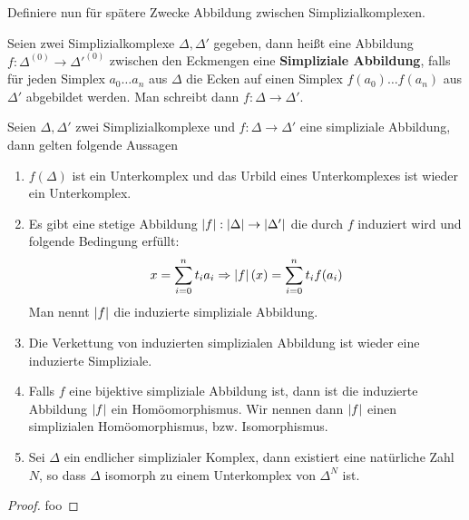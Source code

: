 Definiere nun für spätere Zwecke Abbildung zwischen Simplizialkomplexen.

\begin{Def}
	Seien zwei Simplizialkomplexe $\Delta, \Delta'$ gegeben, dann heißt
	eine Abbildung $f: \Delta^{(0)} \rightarrow \Delta'^{(0)}$ zwischen
	den Eckmengen eine \textbf{Simpliziale Abbildung}, falls für jeden
	Simplex $a_0 \ldots a_n$ aus $\Delta$ die Ecken auf einen Simplex
	$f(a_0) \ldots f(a_n)$ aus $\Delta'$ abgebildet werden. Man schreibt
	dann $f: \Delta \rightarrow \Delta'$.
\end{Def}


\begin{Satz}
	Seien $\Delta, \Delta'$ zwei Simplizialkomplexe und $f: \Delta \rightarrow \Delta'$ eine simpliziale Abbildung, dann gelten
	folgende Aussagen
	\begin{enumerate}[(1)]
		\item $f(\Delta)$ ist ein Unterkomplex und das Urbild eines Unterkomplexes ist wieder ein Unterkomplex.
		\item Es gibt eine stetige Abbildung $\left| f \right| : \left| \Delta \right| \rightarrow \left| \Delta' \right|$ die durch $f$ induziert wird und folgende Bedingung erfüllt:
			\begin{gather*}
				x = \sum\limits_{i=0}^{n} t_i a_i \Rightarrow \left| f \right|(x) = \sum\limits_{i=0}^{n} t_i f(a_i) 
			\end{gather*}
			Man nennt $\left| f \right|$ die induzierte simpliziale Abbildung.
		\item Die Verkettung von induzierten simplizialen Abbildung ist wieder eine induzierte Simpliziale.
		\item Falls $f$ eine bijektive simpliziale Abbildung ist, dann ist 
			die induzierte Abbildung $\left| f \right|$ ein Homöomorphismus. Wir nennen dann $\left| f \right|$ einen simplizialen Homöomorphismus, bzw. Isomorphismus.
		\item Sei $\Delta$ ein endlicher simplizialer Komplex, dann existiert eine natürliche Zahl $N$, so dass $\Delta$ isomorph zu 
		einem Unterkomplex von $\Delta^N$ ist.
	\end{enumerate}
	\begin{proof}
foo	
	\end{proof}
\end{Satz}

